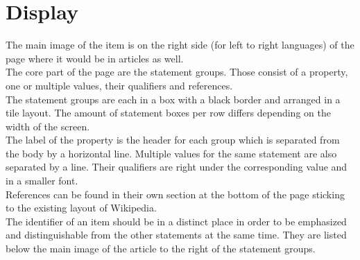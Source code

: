 \section{Display}
	The main image of the item is on the right side (for left to right languages) of the page where it would be in articles as well.\\
	The core part of the page are the statement groups. Those consist of a property, one or multiple values, their qualifiers and references. \\
	The statement groups are each in a box with a black border and arranged in a tile layout. The amount of statement boxes per row differs depending on the width of the screen. \\
	The label of the property is the header for each group which is separated from the body by a horizontal line. Multiple values for the same statement are also separated by a line. Their qualifiers are right under the corresponding value and in a smaller font. \\
	References can be found in their own section at the bottom of the page sticking to the existing layout of Wikipedia. \\
	The identifier of an item should be in a distinct place in order to be emphasized and distinguishable from the other statements at the same time. They are listed below the main image of the article to the right of the statement groups.
	
	
	
	
	